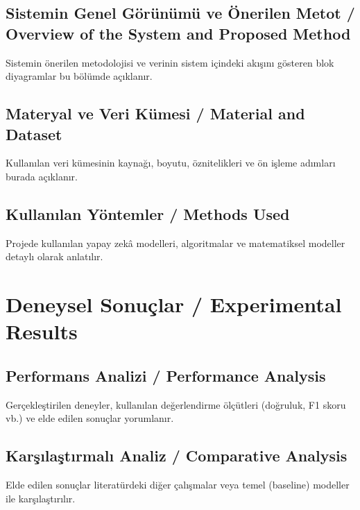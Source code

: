 \documentclass[11pt,a4paper]{article}
\begin{document}
\subsection{Sistemin Genel Görünümü ve Önerilen Metot / Overview of the System and Proposed Method}
\label{subsec:onerilen_metot}
Sistemin önerilen metodolojisi ve verinin sistem içindeki akışını gösteren blok diyagramlar bu bölümde açıklanır.

\subsection{Materyal ve Veri Kümesi / Material and Dataset}
\label{subsec:materyal_veri}
Kullanılan veri kümesinin kaynağı, boyutu, öznitelikleri ve ön işleme adımları burada açıklanır.

\subsection{Kullanılan Yöntemler / Methods Used}
\label{subsec:kullanilan_yontemler}
Projede kullanılan yapay zekâ modelleri, algoritmalar ve matematiksel modeller detaylı olarak anlatılır.

\newpage
\section{Deneysel Sonuçlar / Experimental Results}
\label{sec:sonuclar}

\subsection{Performans Analizi / Performance Analysis}
\label{subsec:performans_analizi}
Gerçekleştirilen deneyler, kullanılan değerlendirme ölçütleri (doğruluk, F1 skoru vb.) ve elde edilen sonuçlar yorumlanır.

\subsection{Karşılaştırmalı Analiz / Comparative Analysis}
\label{subsec:karsilastirmali_analiz}
Elde edilen sonuçlar literatürdeki diğer çalışmalar veya temel (baseline) modeller ile karşılaştırılır.

\newpage
\end{document}
